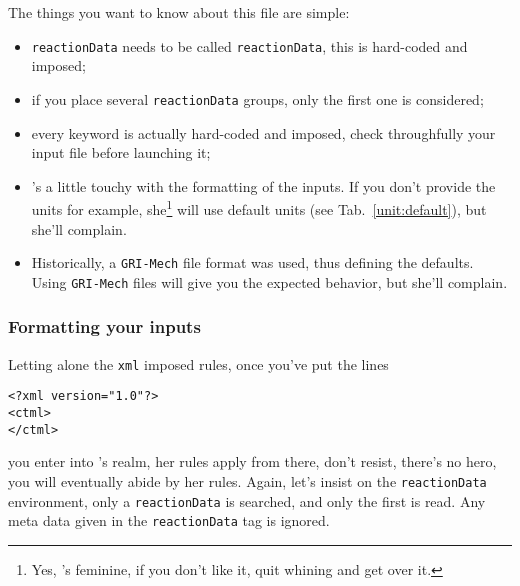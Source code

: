 The things you want to know about this file are simple:
\begin{itemize}
\item \verb!reactionData! needs to be called \verb!reactionData!, 
        this is hard-coded and imposed;
\item if you place several \verb!reactionData! groups, only the first
        one is considered;
\item every keyword is actually hard-coded and imposed, check
        throughfully your input file before launching it;
\item \Antioch's a little touchy with the formatting of the inputs.
        If you don't provide the units for example, she\footnote{Yes, \Antioch's feminine,
        if you don't like it, quit whining and get over it.} will use
        default units (see Tab.~\ref{unit:default}), but she'll complain.
\item Historically, a \verb!GRI-Mech! file format was used, thus defining
        the defaults. Using \verb!GRI-Mech! files will give you the expected
        behavior, but she'll complain.
\end{itemize}

\subsubsection{Formatting your inputs}

Letting alone the \verb!xml! imposed rules, once you've put
the lines
\begin{verbatim}
<?xml version="1.0"?>
<ctml>
</ctml>
\end{verbatim}
you enter into \Antioch's realm, her rules apply from there, don't
resist, there's no hero, you will eventually abide by her rules.
Again, let's insist on the \verb!reactionData! environment, only
a \verb!reactionData! is searched, and only the first is read.
Any meta data given in the \verb!reactionData! tag is ignored.

